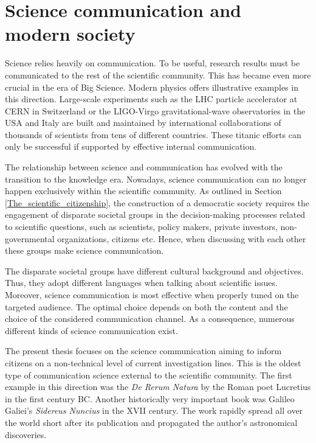 \section{Science communication and modern society}    
Science relies heavily on communication. To be useful, research results must be communicated to the rest of the scientific community. This has became even more crucial in the era of Big Science. Modern physics offers illustrative examples in this direction. Large-scale experiments such as the LHC particle accelerator at CERN in Switzerland or the LIGO-Virgo gravitational-wave observatories in the USA and Italy are built and maintained by international collaborations of thousands of scientists from tens of different countries. These titanic efforts can only be successful if supported by effective internal communication.  

The relationship between science and communication has evolved with the transition to the knowledge era. Nowadays, science communication can no longer happen exclusively within the scientific community. As outlined in Section \ref{The_scientific_citizenship}, the construction of a democratic society requires the engagement of disparate societal groups in the decision-making processes related to scientific questions, such as scientists, policy makers, private investors, non-governmental organizations, citizens etc. Hence, when discussing with each other these groups make science communication.

The disparate societal groups have different cultural background and objectives. Thus, they adopt different languages when talking about scientific issues. Moreover, science communication is most effective when properly tuned on the targeted audience. The optimal choice depends on both the content and the choice of the considered communication channel. As a consequence, numerous different kinds of science communication exist.   

The present thesis focuses on the science communication aiming to inform citizens on a non-technical level of current investigation lines. This is the oldest type of communication science external to the scientific community. The first example in this direction was the \textit{De Rerum Natura} by the Roman poet Lucretius in the first century BC. Another historically very important book was Galileo Galiei's \textit{Sidereus Nuncius} in the XVII century. The work rapidly spread all over the world short after its publication and propagated the author's astronomical discoveries.

